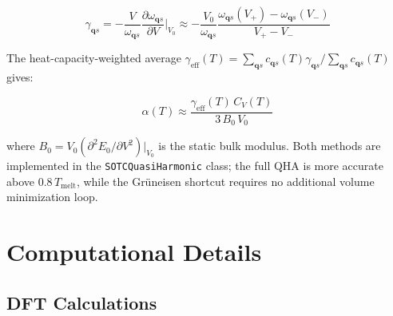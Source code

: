 \documentclass[aps,prb,reprint,amsmath,amssymb,floatfix]{revtex4-2}
\begin{document}
\begin{equation}
\gamma_{\mathbf{q}s} = -\frac{V}{\omega_{\mathbf{q}s}}\frac{\partial\omega_{\mathbf{q}s}}{\partial V}\bigg|_{V_0} \approx -\frac{V_0}{\omega_{\mathbf{q}s}}\frac{\omega_{\mathbf{q}s}(V_+)-\omega_{\mathbf{q}s}(V_-)}{V_+-V_-} \tag{18}
\end{equation}

The heat-capacity-weighted average
\(\gamma_\text{eff}(T) = \sum_{\mathbf{q}s}c_{\mathbf{q}s}(T)\gamma_{\mathbf{q}s}/\sum_{\mathbf{q}s}c_{\mathbf{q}s}(T)\)
gives:

\begin{equation}
\alpha(T) \approx \frac{\gamma_\text{eff}(T)\,C_V(T)}{3\,B_0\,V_0} \tag{19}
\end{equation}

where \(B_0 = V_0(\partial^2 E_0/\partial V^2)|_{V_0}\) is the static
bulk modulus. Both methods are implemented in the
\texttt{SOTCQuasiHarmonic} class; the full QHA is more accurate above
\(0.8\,T_\text{melt}\), while the Grüneisen shortcut requires no
additional volume minimization loop.


\section{Computational Details}\label{computational-details}

\subsection{DFT Calculations}\label{dft-calculations}
\end{document}
